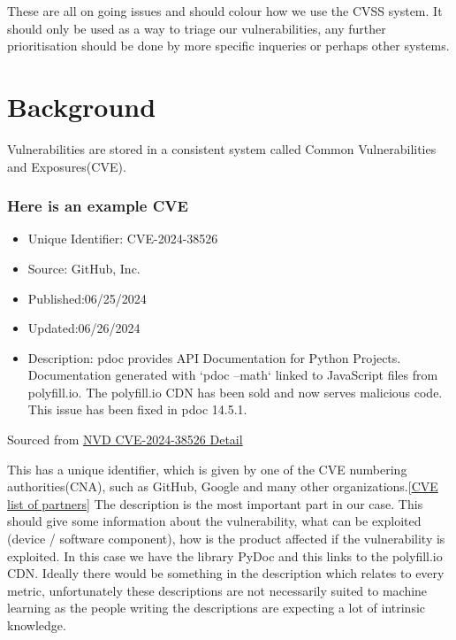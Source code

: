 \documentclass[12pt]{article}
\begin{document}
These are all on going issues and should colour how we use the CVSS system. It should only be used as a way to triage our vulnerabilities, any further
prioritisation should be done by more specific inqueries or perhaps other systems.

\section{Background}

Vulnerabilities are stored in a consistent system called Common Vulnerabilities and
Exposures(CVE\cite{CVE}).

\subsubsection*{Here is an example CVE}
\begin{itemize}
	\item   Unique Identifier: CVE-2024-38526
	\item   Source: GitHub, Inc.
	\item   Published:06/25/2024
	\item   Updated:06/26/2024

	\item   Description: pdoc provides API Documentation for Python Projects. Documentation
	      generated with `pdoc --math` linked to JavaScript files from polyfill.io. The polyfill.io
	      CDN has been sold and now serves malicious code. This issue has been fixed in pdoc 14.5.1.

\end{itemize}

\footnotesize{Sourced from \href{https://nvd.nist.gov/vuln/detail/CVE-2024-38526}{NVD CVE-2024-38526
		Detail}\cite{polyfill}} \\
\bigskip

This has a unique identifier, which is given by one of the CVE numbering authorities(CNA\cite{CNA}), such as
GitHub, Google and many other
organizations.[\href{https://www.cve.org/PartnerInformation/ListofPartners}{CVE list of
			partners}\cite{partners}]
The description is the most important part in our case. This should give some information about the
vulnerability, what can be exploited (device / software component), how is the product affected if
the vulnerability is exploited. In this case we have the library PyDoc and this links to the
polyfill.io CDN. Ideally there would be something in the description which relates to every metric,
unfortunately these descriptions are not necessarily suited to machine learning as the people
writing the descriptions are expecting a lot of intrinsic knowledge.
\end{document}
